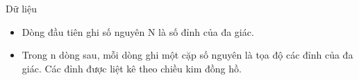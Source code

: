 Dữ liệu  
\begin{itemize}
	\item     Dòng đầu tiên ghi số nguyên N là số đỉnh của đa giác.   
	\item     Trong n dòng sau, mỗi dòng ghi một cặp số nguyên là tọa độ các đỉnh của đa giác. Các đỉnh được liệt kê theo chiều kim đồng hồ.   
\end{itemize}